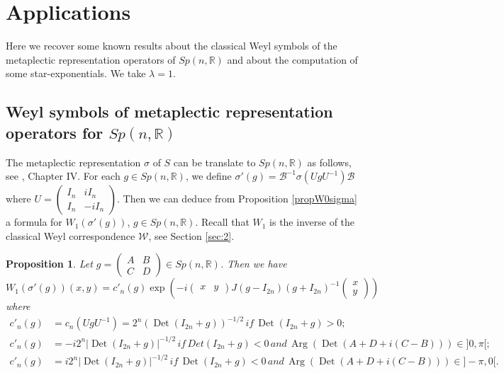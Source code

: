 \documentclass[12pt]{amsart}
\numberwithin{equation}{section}
\newtheorem{proposition}[theorem]{Proposition}
\DeclareMathOperator{\Det}{Det} \DeclareMathOperator{\Tr}{Tr}
\DeclareMathOperator{\Arg}{Arg}
\begin{document}
\section{Applications} \label{sec:8}
Here we recover some known results about the classical Weyl symbols of the metaplectic representation operators of $Sp(n,{\mathbb R})$ and about the computation of some star-exponentials.
We take $\lambda =1$. 

\subsection{Weyl symbols of metaplectic representation operators for $Sp(n,{\mathbb R})$}
The metaplectic representation $\sigma$ of $S$ can be translate to $Sp(n,{\mathbb R})$ as follows, see \cite{Fo}, Chapter IV. For each $g\in Sp(n,{\mathbb R})$, we define
$\sigma'(g) ={\mathcal B}^{-1}\sigma(UgU^{-1}){\mathcal B}$ where  $U=\left(\begin{smallmatrix} I_n&iI_n\\
I_n&-iI_n\end{smallmatrix}\right)$. Then we can deduce from Proposition \ref{propW0sigma}
a formula for $W_1(\sigma'(g))$,  $g\in Sp(n,{\mathbb R})$. Recall that $W_1$ is the inverse of the classical Weyl correspondence $\mathcal W$, see Section \ref{sec:2}.

\begin{proposition}\label{propW1sigma} Let $g=\left(\begin{smallmatrix} A&B\\
C&D\end{smallmatrix}\right)\in Sp(n,{\mathbb R})$. Then we have
\begin{equation*}W_1(\sigma'(g))(x,y)=c'_n(g) \exp \left( -i\begin{pmatrix}x&
y\end{pmatrix}J(g-I_{2n})
(g+I_{2n})^{-1}\begin{pmatrix}x\\y\end{pmatrix}\right)\end{equation*}
where 
\begin{align*}
c'_n(g)&=c_n(UgU^{-1})=2^n(\Det(I_{2n}+g))^{-1/2}\, if \, \Det(I_{2n}+g)>0;\\
c'_n(g)&=-i2^n\vert \Det(I_{2n}+g)\vert^{-1/2}\,if \,Det(I_{2n}+g)<0\, and \,
\Arg(\Det(A+D+i(C-B)))\in ]0,\pi[;\\
c'_n(g)&=i2^n\vert \Det(I_{2n}+g)\vert^{-1/2}\, if \,\Det(I_{2n}+g)<0 \, and
\, \Arg(\Det(A+D+i(C-B)))\in ]-\pi,0[.
\end{align*}
\end{proposition}
\end{document}
